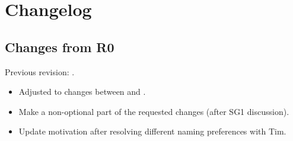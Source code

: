 \section{Changelog}
\subsection{Changes from R0}
Previous revision: \parencite{P0964R0}.
\begin{itemize}
    \item Adjusted to changes between \cite{P0214R8} and \cite{P0214R9}.
    \item Make  a non-optional part of the requested changes (after SG1 discussion).
    \item Update motivation after resolving different naming preferences with Tim.
\end{itemize}
